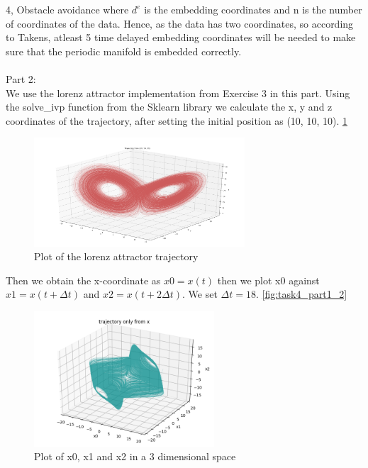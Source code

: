 \documentclass[10pt,a4paper]{article}
\begin{document}
\begin{task}{4, Obstacle avoidance}
where $d^{e}$ is the embedding coordinates and n is the number of coordinates of the data. Hence, as the data has two coordinates, so according to Takens, atleast 5 time delayed embedding coordinates will be needed to make sure that the periodic manifold is embedded correctly. \\\\

Part 2: \\
We use the lorenz attractor implementation from Exercise 3 in this part. Using the solve\_ivp function from the Sklearn library we calculate the x, y and z coordinates of the trajectory, after setting the initial position as (10, 10, 10). \ref{fig:task4_part2_1}

\begin{figure}[H]
\centering
\includegraphics[width=0.7\textwidth]{../plots/task4_part2_1.png}
\caption{Plot of the lorenz attractor trajectory}
\label{fig:task4_part2_1}
\end{figure}

Then we obtain the x-coordinate as $x0 = x(t)$ then we plot x0 against $x1 = x(t + \Delta t)$ and $x2 = x(t + 2\Delta t)$. We set $\Delta t = 18$. \ref{fig:task4_part1_2}

\begin{figure}[H]
\centering
\includegraphics[width=0.6\textwidth]{../plots/task4_part2_2.png}
\caption{Plot of x0, x1 and x2 in a 3 dimensional space}
\label{fig:task4_part2_2}
\end{figure}


\end{task}
\end{document}

